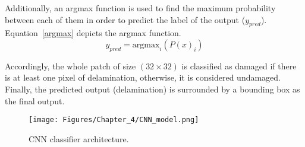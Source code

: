 Additionally, an argmax function is used to find the maximum probability between each of them in order to predict the label of the output (\(y_{pred}\)).
Equation~\ref{argmax} depicts the argmax function.
\begin{equation}
	y_{pred} = \mathrm{argmax}_{i}\left( P(x)_{i} \right)
	\label{argmax}
\end{equation}

Accordingly, the whole patch of size \((32\times 32)\) is classified as damaged if there is at least one pixel of delamination, otherwise, it is considered undamaged.
Finally, the predicted output (delamination) is surrounded by a bounding box as the final output.
\begin{figure}[h!]
	\centering
	\texttt{[image: Figures/Chapter\_4/CNN\_model.png]}
	\caption{CNN classifier architecture.}
	\label{CNN_model}
\end{figure}
